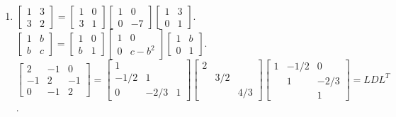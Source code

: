 \documentclass[12pt,a4paper]{article}
\begin{document}
{\begin{enumerate}
			\item $\begin{bmatrix} 1 & 3 \\ 3 & 2 \end{bmatrix} = \begin{bmatrix} 1 & 0 \\ 3 & 1 \end{bmatrix} \begin{bmatrix} 1 & 0 \\ 0 & -7 \end{bmatrix} \begin{bmatrix} 1 & 3 \\ 0 & 1 \end{bmatrix}$.
			$\begin{bmatrix} 1 & b \\ b & c \end{bmatrix} = \begin{bmatrix} 1 & 0 \\ b & 1 \end{bmatrix} \begin{bmatrix} 1 & 0 \\ 0 & c-b^2 \end{bmatrix} \begin{bmatrix} 1 & b \\ 0 & 1 \end{bmatrix}$.
			$\begin{bmatrix} 2 & -1 & 0 \\ -1 & 2 & -1 \\ 0 & -1 & 2 \end{bmatrix} = \begin{bmatrix} 1 & & \\ -1/2 & 1 & \\ 0 & -2/3 & 1 \end{bmatrix} \begin{bmatrix} 2 & & \\ & 3/2 & \\ & & 4/3 \end{bmatrix} \begin{bmatrix} 1 & -1/2 & 0 \\ & 1 & -2/3 \\ & & 1 \end{bmatrix} = LDL^T$.
			

\end{enumerate}}
\end{document}
